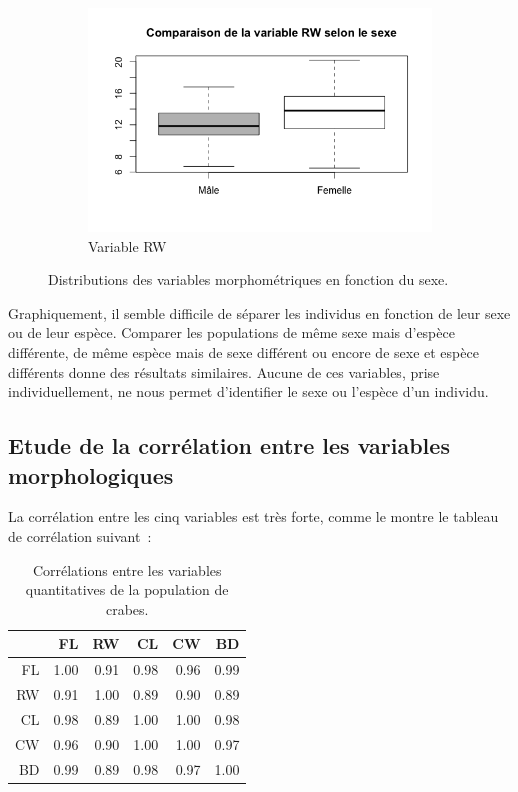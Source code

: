 \documentclass[a4paper,11pt]{report}
\begin{document}
\begin{figure}[H]
\begin{subfigure}[b]{0.3\linewidth}
		\includegraphics[width=1\linewidth]{img/1-2-1-sex-rw.png}
		\caption{\scriptsize Variable RW}
		\label{fig:1_2_1_sex_rw}
	\end{subfigure}%
	\caption{
		\small Distributions des variables morphométriques en fonction du sexe.
	}
	\label{fig:morphemetriques_en_fonction_sexe}%
\end{figure}

Graphiquement, il semble difficile de séparer les individus en fonction de leur sexe ou de leur espèce. Comparer les populations de même sexe mais d'espèce différente, de même espèce mais de sexe différent ou encore de sexe et espèce différents donne des résultats similaires. Aucune de ces variables, prise individuellement, ne nous permet d'identifier le sexe ou l'espèce d'un individu.

\subsection{Etude de la corrélation entre les variables morphologiques}

La corrélation entre les cinq variables est très forte, comme le montre le tableau de corrélation suivant~:
\newpage
\begin{table}[h]
	\centering
	\captionsetup{justification=centering, margin=2cm}
	\caption{Corrélations entre les variables quantitatives de la population de crabes.}
	\begin{tabular}{rrrrrr}
		\hline
		& FL & RW & CL & CW & BD \\ 
		\hline
		FL & 1.00 & 0.91 & 0.98 & 0.96 & 0.99 \\ 
		RW & 0.91 & 1.00 & 0.89 & 0.90 & 0.89 \\ 
		CL & 0.98 & 0.89 & 1.00 & 1.00 & 0.98 \\ 
		CW & 0.96 & 0.90 & 1.00 & 1.00 & 0.97 \\ 
		BD & 0.99 & 0.89 & 0.98 & 0.97 & 1.00 \\ 
		\hline
	\end{tabular}
\end{table}
\end{document}
